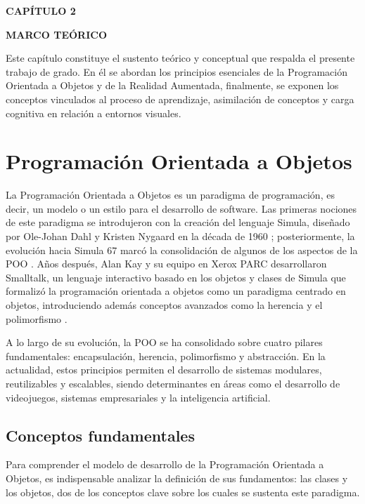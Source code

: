 \setcounter{chapter}{2}
\setcounter{section}{0} 
{\centering
{\large\bfseries CAPÍTULO 2}\par\vspace{0.3cm}
{\Large\bfseries MARCO TEÓRICO}\par}
\vspace{1cm}

Este capítulo constituye el sustento teórico y conceptual que respalda el 
presente trabajo de grado. En él se abordan los principios esenciales de la 
Programación Orientada a Objetos y de la Realidad Aumentada, finalmente, se 
exponen los conceptos vinculados al proceso de aprendizaje, asimilación de 
conceptos y carga cognitiva en relación a entornos visuales.


\section{Programación Orientada a Objetos}
La Programación Orientada a Objetos es un paradigma de programación, es decir, 
un modelo o un estilo para el desarrollo de software. Las primeras nociones de 
este paradigma se introdujeron con la creación del lenguaje Simula, diseñado por 
Ole-Johan Dahl y Kristen Nygaard en la década de 1960 \parencite{Sanchez2026}; 
posteriormente, la evolución hacia Simula 67 marcó la consolidación de algunos 
de los aspectos de la POO \parencite{Dahl2004}. Años después, Alan Kay y su 
equipo en Xerox PARC desarrollaron Smalltalk, un lenguaje interactivo basado en 
los objetos y clases de Simula que formalizó la programación orientada a objetos 
como un paradigma centrado en objetos, introduciendo además conceptos avanzados 
como la herencia y el polimorfismo \parencite{Dahl2004,Sanchez2026}.

A lo largo de su evolución, la POO se ha consolidado sobre cuatro pilares 
fundamentales: encapsulación, herencia, polimorfismo y abstracción. En la 
actualidad, estos principios permiten el desarrollo de sistemas modulares, 
reutilizables y escalables, siendo determinantes en áreas como el desarrollo de 
videojuegos, sistemas empresariales y la  inteligencia artificial. 
\parencite{Sanchez2026}

\subsection{Conceptos fundamentales}
Para comprender el modelo de desarrollo de la Programación Orientada a Objetos, 
es indispensable analizar la definición de sus fundamentos: las clases y los 
objetos, dos de los conceptos clave sobre los cuales se sustenta este paradigma.

